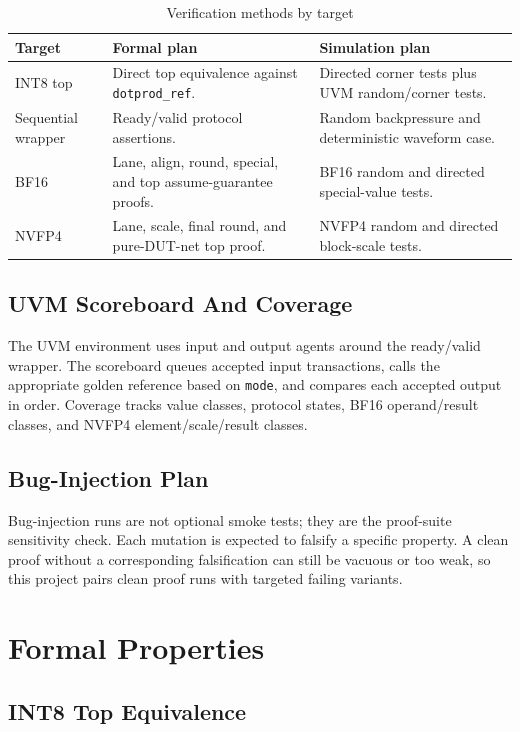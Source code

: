 \documentclass[11pt,oneside]{report}
\begin{document}
\begin{table}[H]
\centering
\caption{Verification methods by target}
\begin{tabular}{p{}p{}p{}}
\toprule
\textbf{Target} & \textbf{Formal plan} & \textbf{Simulation plan} \\
\midrule
INT8 top & Direct top equivalence against \texttt{dotprod\_ref}. &
Directed corner tests plus UVM random/corner tests. \\
Sequential wrapper & Ready/valid protocol assertions. &
Random backpressure and deterministic waveform case. \\
BF16 & Lane, align, round, special, and top assume-guarantee proofs. &
BF16 random and directed special-value tests. \\
NVFP4 & Lane, scale, final round, and pure-DUT-net top proof. &
NVFP4 random and directed block-scale tests. \\
\bottomrule
\end{tabular}
\end{table}

\section{UVM Scoreboard And Coverage}

The UVM environment uses input and output agents around the ready/valid wrapper.
The scoreboard queues accepted input transactions, calls the appropriate golden
reference based on \texttt{mode}, and compares each accepted output in order.
Coverage tracks value classes, protocol states, BF16 operand/result classes, and
NVFP4 element/scale/result classes.

\section{Bug-Injection Plan}

Bug-injection runs are not optional smoke tests; they are the proof-suite
sensitivity check. Each mutation is expected to falsify a specific property. A
clean proof without a corresponding falsification can still be vacuous or too
weak, so this project pairs clean proof runs with targeted failing variants.

\chapter{Formal Properties}

\section{INT8 Top Equivalence}
\end{document}
